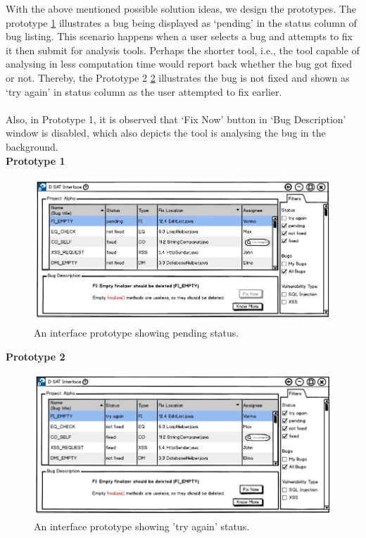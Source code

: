 With the above mentioned possible solution ideas, we design the prototypes. The prototype \ref{fig:d_pending} illustrates a bug being displayed as ‘pending’ in the status column of bug listing. This scenario happens when a user selects a bug and attempts to fix it then submit for analysis tools. Perhaps the shorter tool, i.e., the tool capable of analysing in less computation time would report back whether the bug got fixed or not. Thereby, the Prototype 2 \ref{fig:d_tryagain} illustrates the bug is not fixed and shown as ‘try again’ in status column as the user attempted to fix earlier. \\ \\

Also, in Prototype 1, it is observed that ‘Fix Now’ button in ‘Bug Description’ window is disabled, which also depicts the tool is analysing the bug in the background. \\

\textbf{Prototype 1}

\begin{figure}[hbt!]
	\centering
	\includegraphics[width=\linewidth]{figures/d_pending}
	\caption{An interface prototype showing pending status.}
	\label{fig:d_pending}
\end{figure}

\textbf{Prototype 2}

\begin{figure}[hbt!]
	\centering
	\includegraphics[width=\linewidth]{figures/d_tryagain}
	\caption{An interface prototype showing 'try again' status.}
	\label{fig:d_tryagain}
\end{figure}

